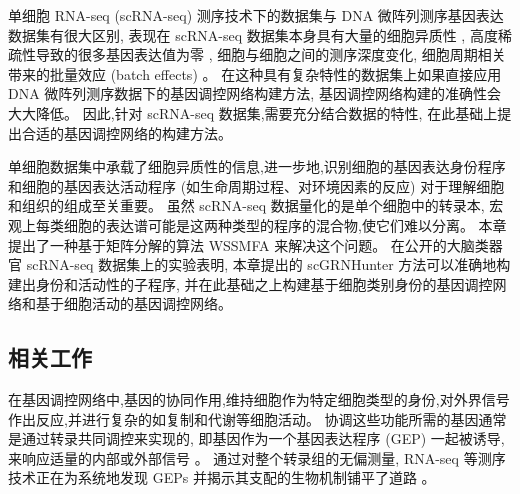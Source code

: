 单细胞 RNA-seq (scRNA-seq) 测序技术下的数据集与 DNA 微阵列测序基因表达数据集有很大区别, 
表现在 scRNA-seq 数据集本身具有大量的细胞异质性 ,
高度稀疏性导致的很多基因表达值为零 ,
细胞与细胞之间的测序深度变化, 细胞周期相关带来的批量效应 (batch effects) 。
在这种具有复杂特性的数据集上如果直接应用 DNA 微阵列测序数据下的基因调控网络构建方法,
基因调控网络构建的准确性会大大降低。
%
因此,针对 scRNA-seq 数据集,需要充分结合数据的特性,
在此基础上提出合适的基因调控网络的构建方法。

单细胞数据集中承载了细胞异质性的信息,进一步地,识别细胞的基因表达身份程序和细胞的基因表达活动程序 (如生命周期过程、对环境因素的反应) 
对于理解细胞和组织的组成至关重要。
虽然 scRNA-seq 数据量化的是单个细胞中的转录本,
宏观上每类细胞的表达谱可能是这两种类型的程序的混合物,使它们难以分离。
本章提出了一种基于矩阵分解的算法 WSSMFA 来解决这个问题。
在公开的大脑类器官 scRNA-seq 数据集上的实验表明,
本章提出的 scGRNHunter 方法可以准确地构建出身份和活动性的子程序, 
并在此基础之上构建基于细胞类别身份的基因调控网络和基于细胞活动的基因调控网络。

\subsection{相关工作}
在基因调控网络中,基因的协同作用,维持细胞作为特定细胞类型的身份,对外界信号作出反应,并进行复杂的如复制和代谢等细胞活动。
协调这些功能所需的基因通常是通过转录共同调控来实现的,
即基因作为一个基因表达程序 (GEP) 一起被诱导,
来响应适量的内部或外部信号 。
通过对整个转录组的无偏测量, RNA-seq 等测序技术正在为系统地发现 GEPs 并揭示其支配的生物机制铺平了道路 。

